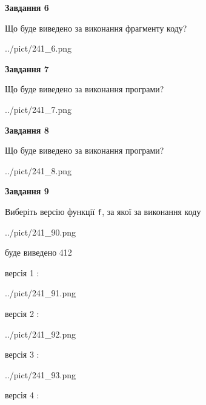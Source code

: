 \documentclass[12pt, ukrainian]{article}
\def\code#1{\Verb!#1!}
\begin{document}
{\begin {large}
{\begin {center}\textbf{Завдання 6}\end {center}}

Що буде виведено за виконання фрагменту коду?\par
\begin{center}
	{../pict/241_6.png}
\end{center}
\newpage

{\begin {center}\textbf{Завдання 7}\end {center}}

Що буде виведено за виконання програми?\par
\begin{center}
	{../pict/241_7.png}
\end{center}
\newpage

{\begin {center}\textbf{Завдання 8}\end {center}}

Що буде виведено за виконання програми?\par
\begin{center}
	{../pict/241_8.png}
\end{center}
\newpage

{\begin {center}\textbf{Завдання 9}\end {center}}

Виберіть версію функції \code{f}, за якої за виконання коду
\begin{center}
	{../pict/241_90.png}
\end{center}
буде виведено 412

\vspace{5mm}
версія 1 :

\begin{center}
	{../pict/241_91.png}
\end{center}
версія 2 :

\begin{center}
	{../pict/241_92.png}
\end{center}
версія 3 :

\begin{center}
	{../pict/241_93.png}
\end{center}
версія 4 :


\end{large}}
\end{document}
